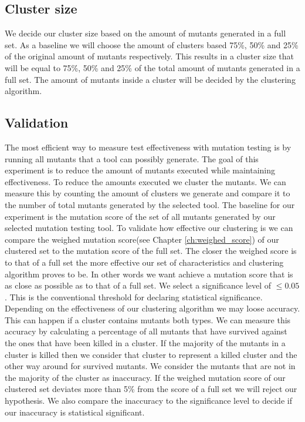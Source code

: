 \documentclass[../../main]{subfiles}
\begin{document}
\subsection{Cluster size}
We decide our cluster size based on the amount of mutants generated in a full set.
As a baseline we will choose the amount of clusters based 75\%, 50\% and 25\% of the original amount of mutants respectively.
This results in a cluster size that will be equal to 75\%, 50\% and 25\% of the total amount of mutants generated in a full set.
The amount of mutants inside a cluster will be decided by the clustering algorithm.

\subsection{Validation}
\label{ch:exp1_validation}
The most efficient way to measure test effectiveness with mutation testing is by running all mutants that a tool can possibly generate.
The goal of this experiment is to reduce the amount of mutants executed while maintaining effectiveness.
To reduce the amounts executed we cluster the mutants. 
We can measure this by counting the amount of clusters we generate and compare it to the number of total mutants generated by the selected tool.
\newline
The baseline for our experiment is the mutation score of the set of all mutants generated by our selected mutation testing tool.
\newline
To validate how effective our clustering is we can compare the weighed mutation score(see Chapter \ref{ch:weighed_score}) of our clustered set to the mutation score of the full set.
The closer the weighed score is to that of a full set the more effective our set of characteristics and clustering algorithm proves to be.
In other words we want achieve a mutation score that is as close as possible as to that of a full set.
We select a significance level of $\leq 0.05$.
This is the conventional threshold for declaring statistical significance\cite{Kirk1996PracticalCome}.
\newline
Depending on the effectiveness of our clustering algorithm we may loose accuracy.
This can happen if a cluster contains mutants both types. 
We can measure this accuracy by calculating a percentage of all mutants that have survived against the ones that have been killed in a cluster.
If the majority of the mutants in a cluster is killed then we consider that cluster to represent a killed cluster and the other way around for survived mutants.
We consider the mutants that are not in the majority of the cluster as inaccuracy.
\newline
If the weighed mutation score of our clustered set deviates more than 5\% from the score of a full set we will reject our hypothesis.
We also compare the inaccuracy to the significance level to decide if our inaccuracy is statistical significant.
\end{document}
